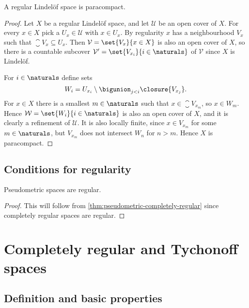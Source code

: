 \documentclass[article, a4paper, 11pt, oneside]{memoir}
\numberwithin{equation}{chapter}
\newcommand{\calU}{\mathcal{U}}
\newcommand{\calV}{\mathcal{V}}
\newcommand{\calW}{\mathcal{W}}
\begin{document}
\begin{proposition}
    \label{thm:regular-Lindelof-is-paracompact}
    A regular Lindelöf space is paracompact.
\end{proposition}

\begin{proof}
    Let $X$ be a regular Lindelöf space, and let $\calU$ be an open cover of $X$. For every $x \in X$ pick a $U_x \in \calU$ with $x \in U_x$. By regularity $x$ has a neighbourhood $V_x$ such that $\closure{V_x} \subseteq U_x$. Then $\calV = \set{V_x}{x \in X}$ is also an open cover of $X$, so there is a countable subcover $\calV' = \set{V_{x_i}}{i \in \naturals}$ of $\calV$ since $X$ is Lindelöf.

    For $i \in \naturals$ define sets
    \begin{equation*}
        W_i = U_{x_i} \setminus \bigunion_{j < i} \closure{V_{x_j}}.
    \end{equation*}
    For $x \in X$ there is a smallest $m \in \naturals$ such that $x \in \closure{V_{x_m}}$, so $x \in W_m$. Hence $\calW = \set{W_i}{i \in \naturals}$ is also an open cover of $X$, and it is clearly a refinement of $\calU$. It is also locally finite, since $x \in V_{x_m}$ for some $m \in \naturals$, but $V_{x_m}$ does not intersect $W_n$ for $n > m$. Hence $X$ is paracompact.
\end{proof}


\section{Conditions for regularity}

\begin{corollary}
    Pseudometric spaces are regular.
\end{corollary}

\begin{proof}
    This will follow from \cref{thm:pseudometric-completely-regular} since completely regular spaces are regular.
\end{proof}



\chapter{Completely regular and Tychonoff spaces}

\section{Definition and basic properties}
\end{document}
